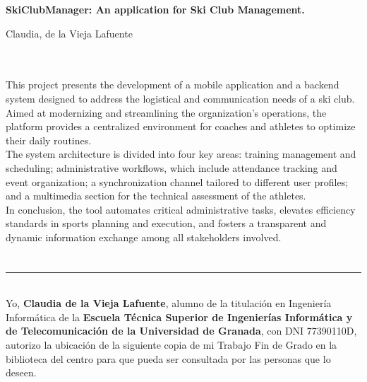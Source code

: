 \begin{center}
{\large\bfseries SkiClubManager: An application for Ski Club Management.}\\
\end{center}
\begin{center}
Claudia, de la Vieja Lafuente\\
\end{center}

\\

\vspace{0.7cm}
\\

This project presents the development of a mobile application and a backend system designed to address the logistical and communication needs of a ski club. Aimed at modernizing and streamlining the organization's operations, the platform provides a centralized environment for coaches and athletes to optimize their daily routines. \\

The system architecture is divided into four key areas: training management and scheduling; administrative workflows, which include attendance tracking and event organization; a synchronization channel tailored to different user profiles; and a multimedia section for the technical assessment of the athletes. \\

In conclusion, the tool automates critical administrative tasks, elevates efficiency standards in sports planning and execution, and fosters a transparent and dynamic information exchange among all stakeholders involved.
\chapter*{}
\thispagestyle{empty}

\noindent\rule[-1ex]{\textwidth}{2pt}\\[4.5ex]

Yo, \textbf{Claudia de la Vieja Lafuente}, alumno de la titulación en Ingeniería Informática de la \textbf{Escuela Técnica Superior
de Ingenierías Informática y de Telecomunicación de la Universidad de Granada}, con DNI 77390110D, autorizo la
ubicación de la siguiente copia de mi Trabajo Fin de Grado en la biblioteca del centro para que pueda ser
consultada por las personas que lo deseen.

